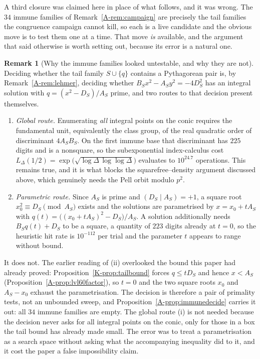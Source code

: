 \documentclass[11pt]{article}
\theoremstyle{definition}
\newtheorem{remark}[theorem]{Remark}
\begin{document}
A third closure was claimed here in place of what follows, and it was wrong. The $34$ immune
families of Remark~\textup{\ref{A-rem:campaign}} are precisely the tail families the congruence
campaign cannot kill, so each is a live candidate and the obvious move is to test them one at a
time. That move \emph{is} available, and the argument that said otherwise is worth setting out,
because its error is a natural one.

\begin{remark}[Why the immune families looked untestable, and why they are not]\label{rem:untestable}
Deciding whether the tail family $S\cup\{q\}$ contains a Pythagorean pair is, by
Remark~\textup{\ref{A-rem:lehmer}}, deciding whether $B_Sx^2-A_Sy^2=-4D_S^2$ has an integral solution
with $q=(x^2-D_S)/A_S$ prime, and two routes to that decision present themselves.
\begin{enumerate}[label=\textup{(\roman*)},leftmargin=2.2em]
\item \emph{Global route.} Enumerating \emph{all} integral points on the conic requires the
fundamental unit, equivalently the class group, of the real quadratic order of discriminant
$4A_SB_S$. On the first immune base that discriminant has $225$ digits and is a nonsquare, so the
subexponential index-calculus cost
$L_\Delta(1/2)=\exp\bigl(\sqrt{\log\Delta\,\log\log\Delta}\bigr)$ evaluates to $10^{24.7}$
operations. This remains true, and it is what blocks the squarefree--density argument discussed
above, which genuinely needs the Pell orbit modulo $p^2$.
\item \emph{Parametric route.} Since $A_S$ is prime and $(D_S\mid A_S)=+1$, a square root
$x_0^2\equiv D_S\pmod{A_S}$ exists and the solutions are parametrised by $x=x_0+tA_S$ with
$q(t)=\bigl((x_0+tA_S)^2-D_S\bigr)/A_S$. A solution additionally needs $B_Sq(t)+D_S$ to be a square,
a quantity of $223$ digits already at $t=0$, so the heuristic hit rate is $10^{-112}$ per trial and
the parameter $t$ appears to range without bound.
\end{enumerate}
It does not. The earlier reading of (ii) overlooked the bound this paper had already proved:
Proposition~\ref{K-prop:tailbound} forces $q\le tD_S$ and hence $x<A_S$
(Proposition~\ref{A-prop:lvl60factor}), so $t=0$ and the two square roots $x_0$ and $A_S-x_0$ exhaust
the parametrisation. The decision is therefore a pair of primality tests, not an unbounded sweep,
and Proposition~\ref{A-prop:immunedecide} carries it out: all $34$ immune families are empty. The
global route (i) is not needed because the decision never asks for all integral points on the conic,
only for those in a box the tail bound has already made small. The error was to treat a
parametrisation as a search space without asking what the accompanying inequality did to it, and it
cost the paper a false impossibility claim.
\end{remark}
\end{document}
